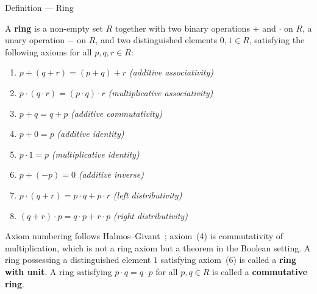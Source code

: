 
\begin{definitionbox}{Definition --- Ring}
\begin{definition}[Ring]
\label{def:ring-of-sets}
A \textbf{ring} is a non-empty set $R$ together with two binary
operations $+$ and $\cdot$ on $R$, a unary operation $-$ on $R$,
and two distinguished elements $0, 1 \in R$, satisfying the
following axioms for all $p, q, r \in R$:
\begin{enumerate}
  \item[(1)] $p + (q + r) = (p + q) + r$
             \hfill\textit{(additive associativity)}
  \item[(2)] $p \cdot (q \cdot r) = (p \cdot q) \cdot r$
             \hfill\textit{(multiplicative associativity)}
  \item[(3)] $p + q = q + p$
             \hfill\textit{(additive commutativity)}
  \item[(5)] $p + 0 = p$
             \hfill\textit{(additive identity)}
  \item[(6)] $p \cdot 1 = p$
             \hfill\textit{(multiplicative identity)}
  \item[(7)] $p + (-p) = 0$
             \hfill\textit{(additive inverse)}
  \item[(8)] $p \cdot (q + r) = p \cdot q + p \cdot r$
             \hfill\textit{(left distributivity)}
  \item[(9)] $(q + r) \cdot p = q \cdot p + r \cdot p$
             \hfill\textit{(right distributivity)}
\end{enumerate}
Axiom numbering follows Halmos--Givant~\cite{HalmosGivant2009};
axiom~(4) is commutativity of multiplication, which is not a ring
axiom but a theorem in the Boolean setting.
A ring possessing a distinguished element $1$ satisfying
axiom~(6) is called a \textbf{ring with unit}.
A ring satisfying $p \cdot q = q \cdot p$ for all $p, q \in R$
is called a \textbf{commutative ring}.
\end{definition}
\end{definitionbox}

